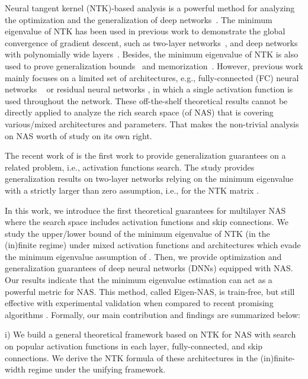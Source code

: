 \documentclass[nohyperref]{article}
\theoremstyle{plain}
\theoremstyle{definition}
\theoremstyle{remark}
\begin{document}
Neural tangent kernel (NTK)-based analysis \citep{jacot2018neural} is a powerful method for analyzing the optimization and the generalization of deep networks~\citep{pmlr-v97-allen-zhu19a, cao2019generalization, chen2020generalized, arora2019fine}. The minimum eigenvalue of NTK has been used in previous work to demonstrate the global convergence of gradient descent, such as two-layer networks~\citep{du2018gradient}, and deep networks with polynomially wide layers~\citep{pmlr-v97-allen-zhu19a}. Besides, the minimum eigenvalue of NTK is also used to prove generalization bounds~\citep{arora2019fine} and memorization~\citep{montanari2020interpolation}. However, previous work mainly focuses on a limited set of architectures, e.g., fully-connected (FC) neural networks ~\citep{allen2018learning, bartlett2017spectrally} or residual neural networks \citep{7780459,huang2020deep}, in which a single activation function is used throughout the network. These off-the-shelf theoretical results cannot be directly applied to analyze the rich search space (of NAS) that is covering various/mixed architectures and parameters. That makes the non-trivial analysis on NAS worth of study on its own right. 


The recent work of \citet{pmlr-v139-oymak21a} is the first work to provide generalization guarantees on a related problem, i.e., activation functions search. The study provides generalization results on two-layer networks relying on the minimum eigenvalue with a strictly larger than zero assumption, i.e.,  for the NTK matrix .


In this work, we introduce the first theoretical guarantees for multilayer NAS where the search space includes activation functions and skip connections. We study the upper/lower bound of the minimum eigenvalue of NTK (in the (in)finite regime) under mixed activation functions and architectures which evade the minimum eigenvalue assumption of \citet{pmlr-v139-oymak21a}. Then, we provide optimization and generalization guarantees of deep neural networks (DNNs) equipped with NAS. 
Our results indicate that the minimum eigenvalue estimation can act as a powerful metric for NAS. This method, called Eigen-NAS, is train-free, but still effective with experimental validation when compared to recent promising algorithms \citep{pmlr-v139-xu21m, chen2021neural, mellor2021neural}. Formally, our main contribution and findings are summarized below:




i) We build a general theoretical framework based on NTK for NAS with search on popular activation functions in each layer, fully-connected, and skip connections. We derive the NTK formula of these architectures in the (in)finite-width regime under the unifying framework.
\end{document}
